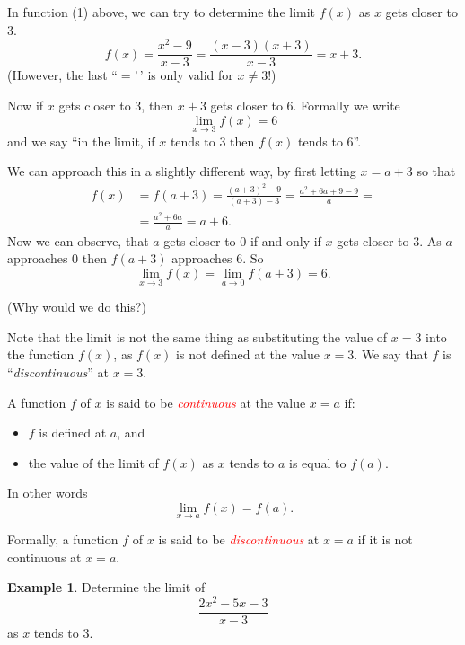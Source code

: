 \documentclass[
  11pt,
  oneside]{book}
\providecommand{\tightlist}{%
  \setlength{\itemsep}{0pt}\setlength{\parskip}{0pt}}
\newcommand{\slide}{}
\theoremstyle{definition}
\theoremstyle{definition}
\newtheorem{example}{Example}[chapter]
\theoremstyle{definition}
\theoremstyle{definition}
\theoremstyle{remark}
\begin{document}
\slide

In function (1) above, we can try to determine the limit \(f(x)\) as \(x\) gets closer to \(3\).
\[
f(x) = \frac{x^2-9}{x-3} = \frac{(x-3)(x+3)}{x-3} = x+3.
\]
(However, the last ``\(=\)'\,' is only valid for \(x\not=3\)!)

Now if \(x\) gets closer to \(3\), then \(x+3\) gets closer to \(6\). Formally we write
\[
\lim\limits_{x\to3} f(x) = 6
\]
and we say ``in the limit, if \(x\) tends to \(3\) then \(f(x)\) tends to 6''.

\slide

We can approach this in a slightly different way, by first letting \(x = a+3\) so that
\begin{align*}
f(x) &= f(a+3) = \frac{(a+3)^2-9}{(a+3)-3} = \frac{a^2+6a + 9 - 9}{a} =\\
&= \frac{a^2+6a}{a} = a+6.
\end{align*}
Now we can observe, that \(a\) gets closer to \(0\) if and only if \(x\) gets closer to \(3\). As \(a\) approaches \(0\) then \(f(a+3)\) approaches \(6\). So
\[
\lim\limits_{x\to3}f(x) = \lim\limits_{a\to0}f(a+3) = 6.
\]

(Why would we do this?)

\slide

Note that the limit is not the same thing as substituting the value of \(x=3\) into the function \(f(x)\), as \(f(x)\) is not defined at the value \(x=3\). We say that \(f\) is ``\emph{discontinuous}'' at \(x=3\).

A function \(f\) of \(x\) is said to be \textcolor{red}{\em continuous} at the value \(x=a\) if:

\begin{itemize}
\tightlist
\item
  \(f\) is defined at \(a\), and
\item
  the value of the limit of \(f(x)\) as \(x\) tends to \(a\) is equal to \(f(a)\).
\end{itemize}

In other words
\[
\lim\limits_{x\to a}f(x) = f(a).
\]

Formally, a function \(f\) of \(x\) is said to be \textcolor{red}{\em discontinuous} at \(x=a\) if it is not continuous at \(x=a\).
\slide

\begin{example}
Determine the limit of
\[
\frac{2x^2-5x-3}{x-3}
\]
as \(x\) tends to \(3\).
\end{example}
\end{document}
